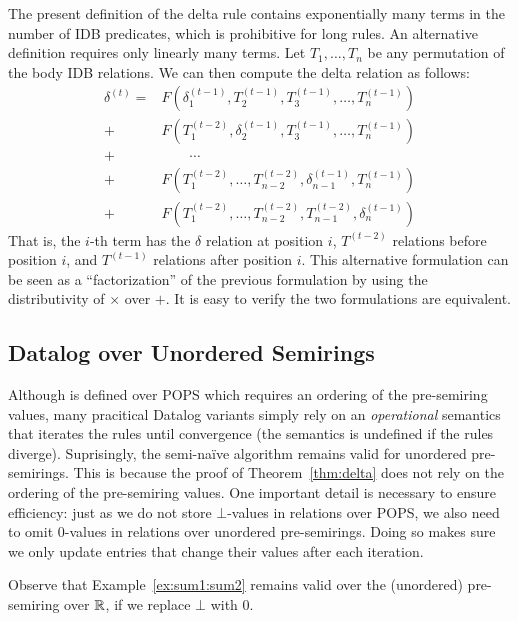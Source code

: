 The present definition of the delta rule contains
 exponentially many terms in the number of IDB predicates, 
 which is prohibitive for long rules.
An alternative definition requires only linearly many terms.
Let $T_1, \ldots, T_n$ be any permutation of the body IDB relations. 
We can then compute the delta relation as follows:
%
\begin{align*}
\delta^{(t)} = & F(\delta_1^{(t-1)}, T_2^{(t-1)}, T_3^{(t-1)},\ldots, T_n^{(t-1)}) \\
 + & F(T_1^{(t-2)}, \delta_2^{(t-1)}, T_3^{(t-1)}, \ldots, T_n^{(t-1)}) \\
 + & \hspace{2em} \cdots  \\
 + & F(T_1^{(t-2)}, \ldots, T_{n-2}^{(t-2)}, \delta_{n-1}^{(t-1)}, T_n^{(t-1)}) \\
 + & F(T_1^{(t-2)}, \ldots, T_{n-2}^{(t-2)}, T_{n-1}^{(t-2)}, \delta_n^{(t-1)})
\end{align*}
%
That is, the $i$-th term has the $\delta$ relation at position $i$, 
 $T^{(t-2)}$ relations before position $i$, 
 and $T^{(t-1)}$ relations after position $i$.
This alternative formulation can be seen as a ``factorization'' 
 of the previous formulation by using the distributivity of 
 $\times$ over $+$. 
It is easy to verify the two formulations are equivalent.

\subsection{Datalog over Unordered Semirings}
\label{sec:unordered}
Although \datalogo is defined over POPS which requires an ordering of the pre-semiring values,
many pracitical Datalog variants simply rely on an {\em operational} semantics
 that iterates the rules until convergence (the semantics is undefined if the rules diverge).
Suprisingly, the semi-na\"ive algorithm remains valid for unordered pre-semirings.
This is because the proof of Theorem~\ref{thm:delta} does not rely on the ordering of the pre-semiring values.
One important detail is necessary to ensure efficiency:
 just as we do not store $\bot$-values in relations over POPS, 
 we also need to omit $0$-values in relations over unordered pre-semirings.
Doing so makes sure we only update entries that change their values after each iteration.

\begin{ex}
\label{ex:unordered}
Observe that Example~\ref{ex:sum1:sum2} remains valid over the (unordered) pre-semiring over $\mathbb R$,
 if we replace $\bot$ with $0$.
\end{ex}

